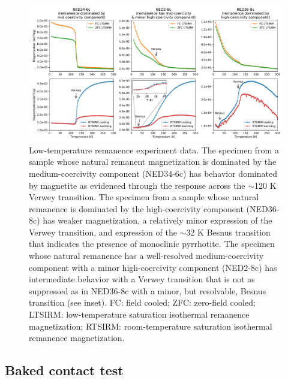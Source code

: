 \documentclass[draft]{agujournal2019}
\begin{document}
\begin{figure}[!ht]
\noindent\includegraphics[width=\textwidth]{./figures/paleomag_MPMS_data.pdf}
\caption{\small{Low-temperature remanence experiment data. The specimen from a sample whose natural remanent magnetization is dominated by the medium-coercivity component (NED34-6c) has behavior dominated by magnetite as evidenced through the response across the $\sim$120 K Verwey transition. The specimen from a sample whose natural remanence is dominated by the high-coercivity component (NED36-8c) has weaker magnetization, a relatively minor expression of the Verwey transition, and expression of the $\sim$32 K Besnus transition that indicates the presence of monoclinic pyrrhotite. The specimen whose natural remanence has a well-resolved medium-coercivity component with a minor high-coercivity component (NED2-8c) has intermediate behavior with a Verwey transition that is not as suppressed as in NED36-8c with a minor, but resolvable, Besnus transition (see inset). FC: field cooled; ZFC: zero-field cooled; LTSIRM: low-temperature saturation isothermal remanence magnetization; RTSIRM: room-temperature saturation isothermal remanence magnetization.}}
\label{fig:MPMS_data}
\end{figure}

\subsection{Baked contact test}
\end{document}
